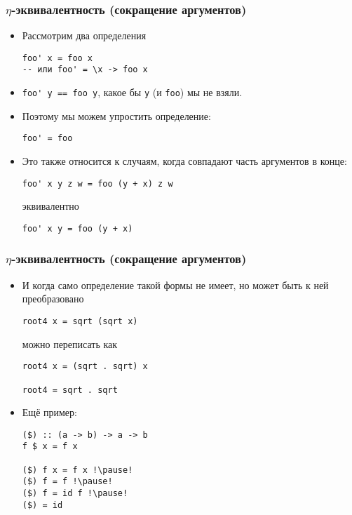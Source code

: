 \documentclass[10pt]{beamer}
\begin{document}
\begin{frame}[fragile]
  \frametitle{$\eta$-эквивалентность (сокращение аргументов)}
  \begin{itemize}
    \item Рассмотрим два определения
          \begin{lstlisting}
foo' x = foo x
-- или foo' = \x -> foo x 
\end{lstlisting}
    \item \lstinline|foo' y == foo y|, какое бы \lstinline|y| (и \lstinline|foo|) мы не взяли.\pause
    \item Поэтому мы можем упростить определение:
          \begin{lstlisting}
foo' = foo
\end{lstlisting}\pause
    \item Это также относится к случаям, когда совпадают часть аргументов в конце:
          \begin{lstlisting}
foo' x y z w = foo (y + x) z w
\end{lstlisting}
          эквивалентно
          \begin{lstlisting}
foo' x y = foo (y + x)
\end{lstlisting}
  \end{itemize}
\end{frame}

\begin{frame}[fragile]
  \frametitle{$\eta$-эквивалентность (сокращение аргументов)}
  \begin{itemize}
    \item И когда само определение такой формы не имеет, но может быть к ней преобразовано
          \begin{lstlisting}
root4 x = sqrt (sqrt x)
\end{lstlisting}
          можно переписать как
          \begin{lstlisting}
root4 x = (sqrt . sqrt) x

root4 = sqrt . sqrt
\end{lstlisting}
    \item Ещё пример:
          \begin{lstlisting}
($) :: (a -> b) -> a -> b
f $ x = f x

($) f x = f x !\pause!
($) f = f !\pause!
($) f = id f !\pause!
($) = id
\end{lstlisting}
  \end{itemize}
\end{frame}
\end{document}
